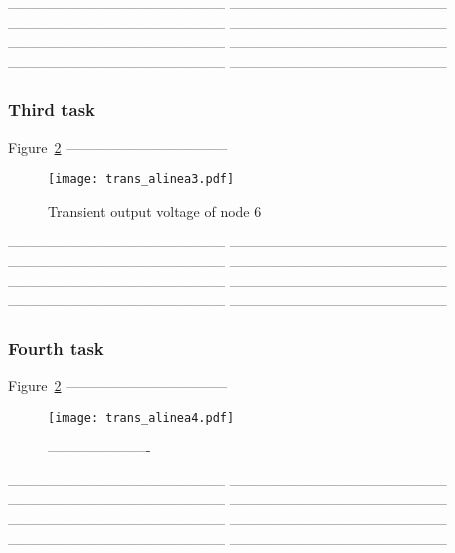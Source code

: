 -----------------------------------------------
-----------------------------------------------
-----------------------------------------------
-----------------------------------------------
-----------------------------------------------
-----------------------------------------------
-----------------------------------------------
-----------------------------------------------



\subsubsection{Third task}

Figure~\ref{fig:trans_al3} ----------------------------------- 

\begin{figure}[H] \centering
  \texttt{[image: trans\_alinea3.pdf]}
  \caption{Transient output voltage of node 6 }
  \label{fig:trans_al3}
  \end{figure}

-----------------------------------------------
-----------------------------------------------
-----------------------------------------------
-----------------------------------------------
-----------------------------------------------
-----------------------------------------------
-----------------------------------------------
-----------------------------------------------


\subsubsection{Fourth task}

Figure~\ref{fig:trans_al3} ----------------------------------- 

\begin{figure}[H] \centering
  \texttt{[image: trans\_alinea4.pdf]}
  \caption{ ---------------------- }
  \label{fig:trans_al3}
  \end{figure}

-----------------------------------------------
-----------------------------------------------
-----------------------------------------------
-----------------------------------------------
-----------------------------------------------
-----------------------------------------------
-----------------------------------------------
-----------------------------------------------

